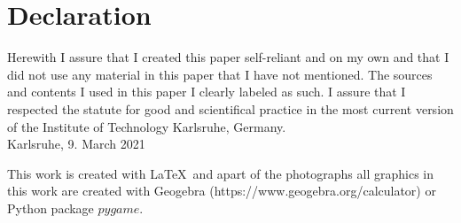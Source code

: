 \documentclass[12pt,a4paper]{scrartcl}
\newcommand{\1}{\mathbbm{1}}
\theoremstyle{definition}
\numberwithin{equation}{section}
\begin{document}
\newpage
  
\thispagestyle{empty}

\vspace{8cm}


\section{Declaration}

Herewith I assure that I created this paper self-reliant and on my own and that I did not use any material in this paper that I have not mentioned. The sources and contents I used in this paper I clearly labeled as such. I assure that I respected the statute for good and scientifical practice in the most current version of the Institute of Technology Karlsruhe, Germany.\\[2ex] 

\noindent
Karlsruhe, 9. March 2021\\[5ex] 

\vspace*{\fill}

This work is created with \LaTeX\ and apart of the photographs all graphics in this work are created with Geogebra (https://www.geogebra.org/calculator) or Python package $\mathit{pygame}$. 
\end{document}
